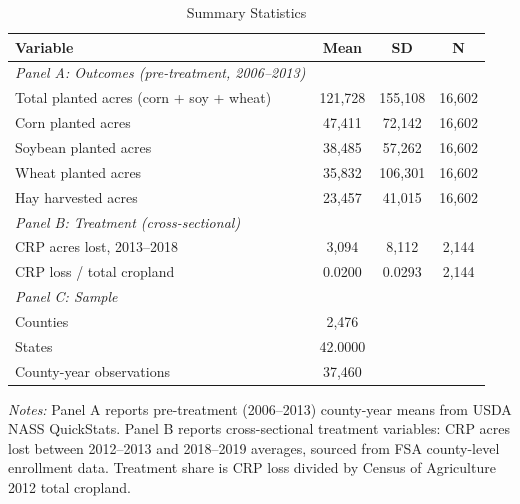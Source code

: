 \begin{table}[t]
\centering
\caption{Summary Statistics}
\label{tab:summary}
\begin{tabular}{lccc}
\hline\hline
Variable & Mean & SD & N \\
\hline
\emph{Panel A: Outcomes (pre-treatment, 2006--2013)} & & & \\
\quad Total planted acres (corn + soy + wheat) & 121,728 & 155,108 & 16,602 \\
\quad Corn planted acres & 47,411 & 72,142 & 16,602 \\
\quad Soybean planted acres & 38,485 & 57,262 & 16,602 \\
\quad Wheat planted acres & 35,832 & 106,301 & 16,602 \\
\quad Hay harvested acres & 23,457 & 41,015 & 16,602 \\
\emph{Panel B: Treatment (cross-sectional)} & & & \\
\quad CRP acres lost, 2013--2018 & 3,094 & 8,112 & 2,144 \\
\quad CRP loss / total cropland & 0.0200 & 0.0293 & 2,144 \\
\emph{Panel C: Sample} & & & \\
\quad Counties & 2,476 &  &  \\
\quad States & 42.0000 &  &  \\
\quad County-year observations & 37,460 &  &  \\
\hline\hline
\end{tabular}
\begin{tablenotes}[flushleft]\small
\item \textit{Notes:} Panel A reports pre-treatment (2006--2013) county-year means from USDA NASS QuickStats. Panel B reports cross-sectional treatment variables: CRP acres lost between 2012--2013 and 2018--2019 averages, sourced from FSA county-level enrollment data. Treatment share is CRP loss divided by Census of Agriculture 2012 total cropland.
\end{tablenotes}
\end{table}

